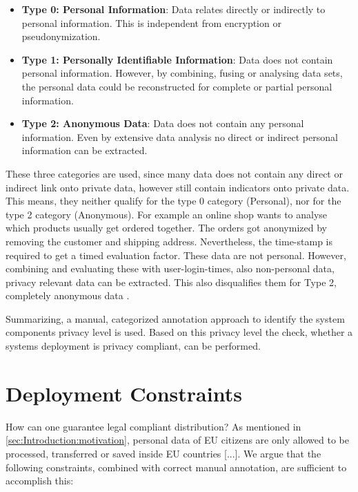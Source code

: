 \begin{itemize}
	\item \textbf{Type 0: Personal Information}: Data relates directly or indirectly to personal information. This is independent from encryption or pseudonymization.
	
	\item \textbf{Type 1: Personally Identifiable Information}:  Data does not contain personal information. However, by combining, fusing or analysing data sets, the personal data could be reconstructed for complete or partial personal information.
	
	\item \textbf{Type 2: Anonymous Data}: Data does not contain any personal information. Even by extensive data analysis no direct or indirect personal information can be extracted.
	
	\label{sec:PrivacyConcept:dataprivacylevel}
\end{itemize}

These three categories are used, since many data does not contain any direct or indirect link onto private data, however still contain indicators onto private data. This means, they neither qualify for the type 0 category (Personal), nor for the type 2 category (Anonymous). For example an online shop wants to analyse which products usually get ordered together. The orders got anonymized by removing the customer and shipping address. Nevertheless, the time-stamp is required to get a timed evaluation factor. These data are not personal. However, combining and evaluating these with user-login-times, also non-personal data, privacy relevant data can be extracted. This also disqualifies them for Type 2, completely anonymous data \cite{Schmieders.}\cite{Schmieders.2015}.

Summarizing, a manual, categorized annotation approach to identify the system components privacy level is used. Based on this privacy level the check, whether a systems deployment is privacy compliant, can be performed.


\section{Deployment Constraints}
\label{sec:PrivacyConcept:deploymentrules}

How can one guarantee legal compliant distribution? As mentioned in \autoref{sec:Introduction:motivation}, personal data of EU citizens are only allowed to be processed, transferred or saved inside EU countries [...]. We argue that the following constraints, combined with correct manual annotation, are sufficient to accomplish this:


